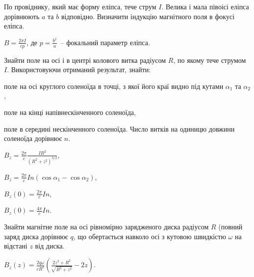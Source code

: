 
\begin{problem}\label{prb:fielinellipsefocus}
По провіднику, який має форму еліпса, тече струм $I$. Велика і мала півоісі еліпса дорівнюють $a$ та $b$ відповідно. Визначити індукцію магнітного поля в фокусі еліпса.
\begin{solution}
	$B = \frac{2\pi I}{cp}$, де $p = \frac{b^2}{a}$~-- фокальний параметр еліпса.
\end{solution}
\end{problem}

\begin{problem}
Знайти поле на осі і в центрі колового витка радіусом $R$, по якому тече струмом $I$. Використовуючи отриманий результат, знайти:
\begin{enumerate*}[label=\alph*)]
	\item поле на осі круглого соленоїда в точці, з якої його краї видно під кутами $\alpha_1$ та $\alpha_2$,
	\item поле на кінці напівнескінченного соленоїда,
	\item поле в середині нескінченного соленоїда. Число витків на одиницю довжини соленоїда дорівнює $n$.
\end{enumerate*}
\begin{solution}
	$B_z = \frac{2\pi}{c}\frac{I R^2}{(R^2 + z^2)^{3/2}}$,
	\begin{enumerate*}[label=\alph*)]
		\item $B_z = \frac{2\pi}{c} In (\cos\alpha_1 - \cos\alpha_2)$,
		\item $B_z(0) = \frac{2\pi}{c} In$,
		\item $B_z(0) = \frac{4\pi}{c} In$.
	\end{enumerate*}
\end{solution}
\end{problem}

\begin{problem}\label{prb:MF_rotated_disk} %
Знайти магнітне поле на осі рівномірно зарядженого диска радіусом $R$ (повний заряд диска дорівнює $q$, що обертається навколо осі з кутовою швидкістю $\omega$ на відстані $z$ від диска.
\begin{solution}
	$B_z(z) = \frac{2q\omega}{cR^2}\left(\frac{2z^2 + R^2}{\sqrt{R^2 + z^2}} - 2z\right)$.
\end{solution}
\end{problem}

